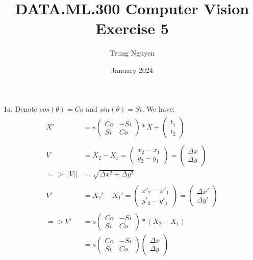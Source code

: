 \documentclass{article}
\title{DATA.ML.300 Computer Vision Exercise 5}
\author{Trung Nguyen}
\date{January 2024}
\begin{document}
\maketitle
\section{}
\noindent 1a. Denote $cos(\theta)=Co$ and $sin(\theta)=Si$. We have:
\begin{gather*}
\begin{split}
    X' &= s\begin{pmatrix} Co&-Si \\ Si&Co\end{pmatrix} *
           X + \begin{pmatrix} t_1 \\ t_2 \end{pmatrix} \\ \\               
    V &= X_2 - X_1 = \begin{pmatrix} x_2-x_1 \\ y_2-y_1 \end{pmatrix}
                   = \begin{pmatrix} \Delta x \\ \Delta y \end{pmatrix} \\
=> ||V|| &= \sqrt{\Delta x^2 + \Delta y^2} \\ \\
    V' &= X_2' - X_1' = \begin{pmatrix} x'_2-x'_1 \\ y'_2-y'_1 \end{pmatrix}
                   = \begin{pmatrix} \Delta x' \\ \Delta y' \end{pmatrix} \\\\
=>  V' &= s\begin{pmatrix} Co&-Si \\ Si&Co\end{pmatrix} * (X_2 - X_1) \\
       &= s\begin{pmatrix} Co&-Si \\ Si&Co\end{pmatrix}\begin{pmatrix} \Delta x \\ \Delta y \end{pmatrix} \\

\end{split}
\end{gather*}
\end{document}
